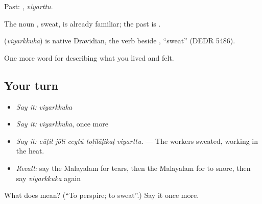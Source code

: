 Past: , \emph{viyarttu}.

The noun , sweat, is already familiar; the past is .

\begin{cousinweb}
\textbf{} (\emph{viyarkkuka}) is native Dravidian, the verb beside , \textquotedblleft{}sweat\textquotedblright{} (DEDR 5486).
\end{cousinweb}

\begin{grammarlens}[title={What you've built}]
One more word for describing what you lived and felt.
\end{grammarlens}

\subsection*{Your turn}
\begin{itemize}
\raggedright
  \item \emph{Say it:} \emph{viyarkkuka}
  \item \emph{Say it:} \emph{viyarkkuka}, once more
  \item \emph{Say it:} \emph{cūṭil jōli ceytŭ toḻilāḷikaḷ viyarttu.} — The workers sweated, working in the heat.
  \item \emph{Recall:} say the Malayalam for tears, then the Malayalam for to snore, then say \emph{viyarkkuka} again
\end{itemize}

\begin{tcolorbox}[breakable,colback=teal!4,colframe=teal!35!black,title={Before you move on}]
What does  mean? (\textquotedblleft{}To perspire; to sweat\textquotedblright{}.) Say it once more.
\end{tcolorbox}
